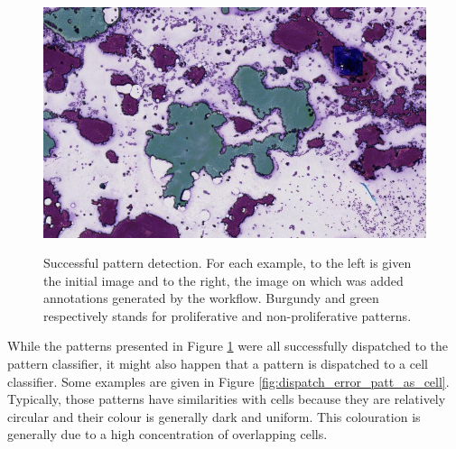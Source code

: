 \begin{figure}
{		\includegraphics[scale=0.31]{image/success_pattern_4_pat.png}
	}
	\caption{Successful pattern detection. For each example, to the left is given the initial image and to the right, the image on which was added annotations generated by the workflow. Burgundy and green respectively stands for proliferative and non-proliferative patterns.}
	\label{fig:detect_success_pattern}
\end{figure}

While the patterns presented in Figure \ref{fig:detect_success_pattern} were all successfully dispatched to the pattern classifier, it might also happen that a pattern is dispatched to a cell classifier. Some examples are given in Figure \ref{fig:dispatch_error_patt_as_cell}. Typically, those patterns have similarities with cells because they are relatively circular and their colour is generally dark and uniform. This colouration is generally due to a high concentration of overlapping cells.

